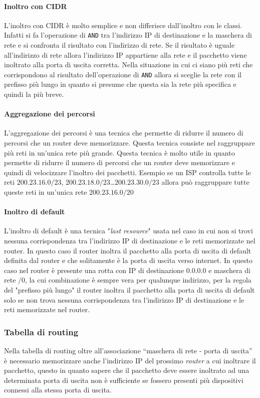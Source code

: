             \paragraph{Inoltro con \Acrshort*{CIDR}} L'inoltro con \Acrshort*{CIDR} è molto semplice e non differisce dall'inoltro con le classi. Infatti si fa l'operazione di \texttt{AND} tra l'indirizzo \Acrshort*{IP} di destinazione e la maschera di rete e si confronta il risultato con l'indirizzo di rete. Se il risultato è uguale all'indirizzo di rete allora l'indirizzo \Acrshort*{IP} appartiene alla rete e il pacchetto viene inoltrato alla porta di uscita corretta. Nella situazione in cui ci siano più reti che corrispondono al risultato dell'operazione di \texttt{AND} allora si sceglie la rete con il prefisso più lungo in quanto si presume che questa sia la rete più specifica e quindi la più breve.
            \paragraph{Aggregazione dei percorsi} L'aggregazione dei percorsi è una tecnica che permette di ridurre il numero di percorsi che un router deve memorizzare. Questa tecnica consiste nel raggruppare più reti in un'unica rete più grande. Questa tecnica è molto utile in quanto permette di ridurre il numero di percorsi che un router deve memorizzare e quindi di velocizzare l'inoltro dei pacchetti. Esempio se un \Acrshort*{ISP} controlla tutte le reti $200.23.16.0/23$, $200.23.18.0/23$\dots $200.23.30.0/23$ allora può raggruppare tutte queste reti in un'unica rete $200.23.16.0/20$
            \paragraph{Inoltro di default} L'inoltro di default è una tecnica "\textit{last resource}" usata nel caso in cui non si trovi nessuna corrispondenza tra l'indirizzo \Acrshort*{IP} di destinazione e le reti memorizzate nel router. In questo caso il router inoltra il pacchetto alla porta di uscita di default definita dal router e che solitamente è la porta di uscita verso internet. In questo caso nel router è presente una rotta con \Acrshort*{IP} di destinazione $0.0.0.0$ e maschera di rete $/0$, la cui combinazione è sempre vera per qualunque indirizzo, per la regola del "prefisso più lungo" il router inoltra il pacchetto alla porta di uscita di default solo se non trova nessuna corrispondenza tra l'indirizzo \Acrshort*{IP} di destinazione e le reti memorizzate nel router.
        \subsubsection{Tabella di routing}
            Nella tabella di routing oltre all'associazione ``maschera di rete - porta di uscita'' è necessario memorizzare anche l'indirizzo \Acrshort*{IP} del prossimo \textit{router} a cui inoltrare il pacchetto, questo in quanto sapere che il pacchetto deve essere inoltrato ad una determinata porta di uscita non è sufficiente se fossero presenti più dispositivi connessi alla stessa porta di uscita.
